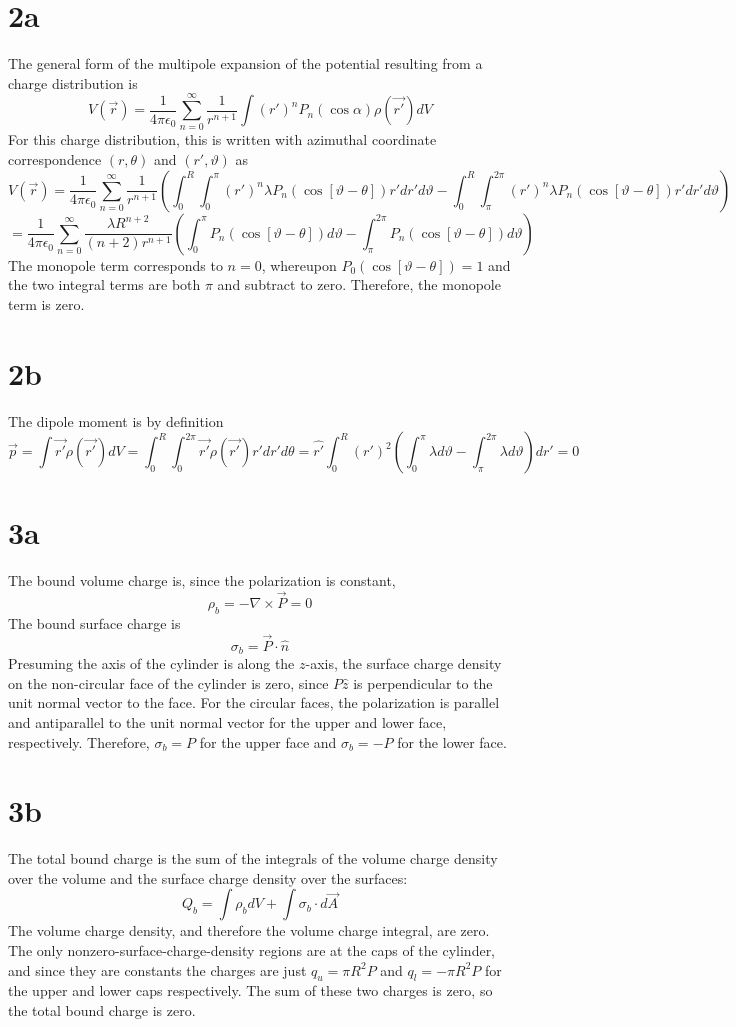 \documentclass{article}
\begin{document}
\section*{2a}
The general form of the multipole expansion of the potential resulting from a charge distribution is
\[V(\vec{r})=\frac{1}{4\pi\epsilon_0}\sum_{n=0}^\infty\frac{1}{r^{n+1}}\int (r')^nP_n(\cos\alpha)\rho(\vec{r'})dV\]
For this charge distribution, this is written with azimuthal coordinate correspondence $(r,\theta)$ and $(r',\vartheta)$ as
\[V(\vec{r})=\frac{1}{4\pi\epsilon_0}\sum_{n=0}^\infty\frac{1}{r^{n+1}}\left( \int_0^R\int_0^{\pi}(r')^n\lambda P_n(\cos[\vartheta-\theta])r'dr'd\vartheta-\int_0^R\int_\pi^{2\pi}(r')^n\lambda P_n(\cos[\vartheta-\theta])r'dr'd\vartheta\right)\]
\[=\frac{1}{4\pi\epsilon_0}\sum_{n=0}^\infty\frac{\lambda R^{n+2}}{(n+2)r^{n+1}}\left( \int_0^\pi P_n(\cos[\vartheta-\theta])d\vartheta -\int_\pi^{2\pi}P_n(\cos[\vartheta-\theta])d\vartheta\right)\]
The monopole term corresponds to $n=0$, whereupon $P_0(\cos[\vartheta-\theta])=1$ and the two integral terms are both $\pi$ and subtract to zero. Therefore, the monopole term is zero.

\section*{2b}
The dipole moment is by definition
\[\vec{p}=\int\vec{r'}\rho(\vec{r'})dV=\int_0^R\int_0^{2\pi}\vec{r'}\rho(\vec{r'})r'dr'd\theta=\hat{r'}\int_0^R(r')^2\left( \int_0^\pi\lambda d\vartheta-\int_\pi^{2\pi}\lambda d\vartheta\right)dr'=0\]

\section*{3a}
The bound volume charge is, since the polarization is constant,
\[\rho_b=-\nabla\times \vec{P}=0\]
The bound surface charge is
\[\sigma_b=\vec{P}\cdot\hat{n}\]
Presuming the axis of the cylinder is along the $z$-axis, the surface charge density on the non-circular face of the cylinder is zero, since $P\hat{z}$ is perpendicular to the unit normal vector to the face. For the circular faces, the polarization is parallel and antiparallel to the unit normal vector for the upper and lower face, respectively. Therefore, $\sigma_b=P$ for the upper face and $\sigma_b=-P$ for the lower face.

\section*{3b}
The total bound charge is the sum of the integrals of the volume charge density over the volume and the surface charge density over the surfaces:
\[Q_b=\int\rho_bdV+\int\sigma_b\cdot d\vec{A}\]The volume charge density, and therefore the volume charge integral, are zero. The only nonzero-surface-charge-density regions are at the caps of the cylinder, and since they are constants the charges are just $q_u=\pi R^2P$ and $q_l=-\pi R^2P$ for the upper and lower caps respectively. The sum of these two charges is zero, so the total bound charge is zero.
\end{document}
